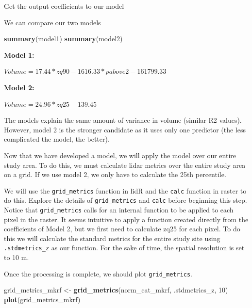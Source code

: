 \documentclass[
]{book}
\newenvironment{Shaded}{\begin{snugshade}}{\end{snugshade}}
\newcommand{\DecValTok}[1]{\textcolor[rgb]{0.00,0.00,0.81}{#1}}
\newcommand{\FunctionTok}[1]{\textcolor[rgb]{0.13,0.29,0.53}{\textbf{#1}}}
\newcommand{\NormalTok}[1]{#1}
\newcommand{\OtherTok}[1]{\textcolor[rgb]{0.56,0.35,0.01}{#1}}
\newcommand{\SpecialCharTok}[1]{\textcolor[rgb]{0.81,0.36,0.00}{\textbf{#1}}}
\begin{document}
Get the output coefficients to our model

\begin{Shaded}
\end{Shaded}

We can compare our two models

\begin{Shaded}
\begin{Highlighting}[]
\FunctionTok{summary}\NormalTok{(model1)}
\FunctionTok{summary}\NormalTok{(model2)}
\end{Highlighting}
\end{Shaded}

\textbf{Model 1:}

\({Volume = 17.44 * zq90 - 1616.33 * pabove2 - 161799.33}\)

\textbf{Model 2:}

\({Volume = 24.96 * zq25 - 139.45}\)

The models explain the same amount of variance in volume (similar R2 values). However, model 2 is the stronger candidate as it uses only one predictor (the less complicated the model, the better).

Now that we have developed a model, we will apply the model over our entire study area. To do this, we must calculate lidar metrics over the entire study area on a grid. If we use model 2, we only have to calculate the 25th percentile.

We will use the \texttt{grid\_metrics} function in lidR and the \texttt{calc} function in raster to do this. Explore the details of \texttt{grid\_metrics} and \texttt{calc} before beginning this step. Notice that \texttt{grid\_metrics} calls for an internal function to be applied to each pixel in the raster. It seems intuitive to apply a function created directly from the coefficients of Model 2, but we first need to calculate zq25 for each pixel. To do this we will calculate the standard metrics for the entire study site using \texttt{.stdmetrics\_z} as our function. For the sake of time, the spatial resolution is set to 10 m.

Once the processing is complete, we should plot \texttt{grid\_metrics}.

\begin{Shaded}
\begin{Highlighting}[]
\NormalTok{grid\_metrics\_mkrf }\OtherTok{\textless{}{-}} \FunctionTok{grid\_metrics}\NormalTok{(norm\_cat\_mkrf, .stdmetrics\_z, }\DecValTok{10}\NormalTok{)}
\FunctionTok{plot}\NormalTok{(grid\_metrics\_mkrf)}
\end{Highlighting}
\end{Shaded}
\end{document}
